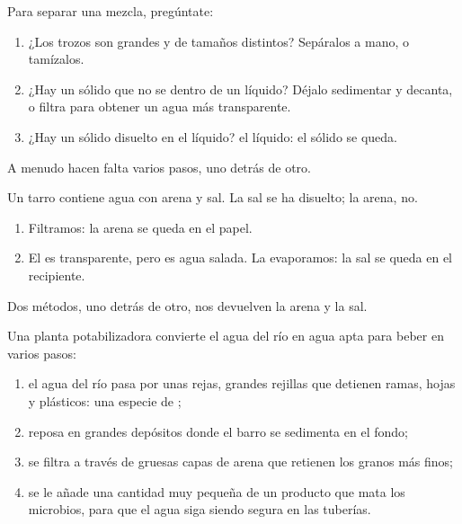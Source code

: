 \begin{method}\label{met:g3:separating-mixtures:choose}
Para separar una mezcla, pregúntate:
\begin{enumerate}
  \item ¿Los trozos son grandes y de tamaños distintos? Sepáralos a mano,
        o tamízalos.
  \item ¿Hay un sólido que no se  dentro de un líquido? Déjalo
        sedimentar y decanta, o filtra para obtener un agua más
        transparente.
  \item ¿Hay un sólido disuelto en el líquido?  el líquido: el
        sólido se queda.
\end{enumerate}
A menudo hacen falta varios pasos, uno detrás de otro.
\end{method}

\begin{example}\label{ex:g3:separating-mixtures:three}
Un tarro contiene agua con arena y sal. La sal se ha disuelto; la arena,
no.
\begin{enumerate}
  \item Filtramos: la arena se queda en el papel.
  \item El  es transparente, pero es agua salada. La evaporamos:
        la sal se queda en el recipiente.
\end{enumerate}
Dos métodos, uno detrás de otro, nos devuelven la arena y la sal.
\end{example}

\begin{example}\label{ex:g3:separating-mixtures:plant}
Una planta potabilizadora convierte el agua del río en agua apta para
beber en varios pasos:
\begin{enumerate}
  \item el agua del río pasa por unas rejas, grandes rejillas que
        detienen ramas, hojas y plásticos: una especie de ;
  \item reposa en grandes depósitos donde el barro se sedimenta en el
        fondo;
  \item se filtra a través de gruesas capas de arena que retienen los
        granos más finos;
  \item se le añade una cantidad muy pequeña de un producto que mata los
        microbios, para que el agua siga siendo segura en las tuberías.
\end{enumerate}
\end{example}

